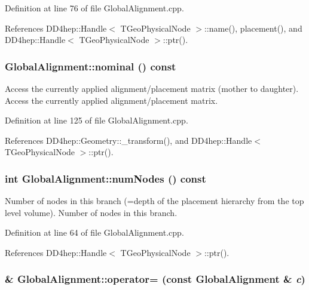 Definition at line 76 of file GlobalAlignment.cpp.

References DD4hep::Handle$<$ TGeoPhysicalNode $>$::name(), placement(), and DD4hep::Handle$<$ TGeoPhysicalNode $>$::ptr().\hypertarget{class_d_d4hep_1_1_alignments_1_1_global_alignment_a975ed8070110b96afc671388d8b3e31f}{
\subsubsection[{nominal}]{ GlobalAlignment::nominal () const}}
\label{class_d_d4hep_1_1_alignments_1_1_global_alignment_a975ed8070110b96afc671388d8b3e31f}


Access the currently applied alignment/placement matrix (mother to daughter). Access the currently applied alignment/placement matrix. 

Definition at line 125 of file GlobalAlignment.cpp.

References DD4hep::Geometry::\_\-transform(), and DD4hep::Handle$<$ TGeoPhysicalNode $>$::ptr().\hypertarget{class_d_d4hep_1_1_alignments_1_1_global_alignment_a1dba2022e2a869a16901a9606c629d57}{
\subsubsection[{numNodes}]{\setlength{\rightskip}{0pt plus 5cm}int GlobalAlignment::numNodes () const}}
\label{class_d_d4hep_1_1_alignments_1_1_global_alignment_a1dba2022e2a869a16901a9606c629d57}


Number of nodes in this branch (=depth of the placement hierarchy from the top level volume). Number of nodes in this branch. 

Definition at line 64 of file GlobalAlignment.cpp.

References DD4hep::Handle$<$ TGeoPhysicalNode $>$::ptr().\hypertarget{class_d_d4hep_1_1_alignments_1_1_global_alignment_a723fc5d2669d586790c48ff820880171}{
\subsubsection[{operator=}]{ \& GlobalAlignment::operator= (const {\bf GlobalAlignment} \& {\em c})}}
\label{class_d_d4hep_1_1_alignments_1_1_global_alignment_a723fc5d2669d586790c48ff820880171}


